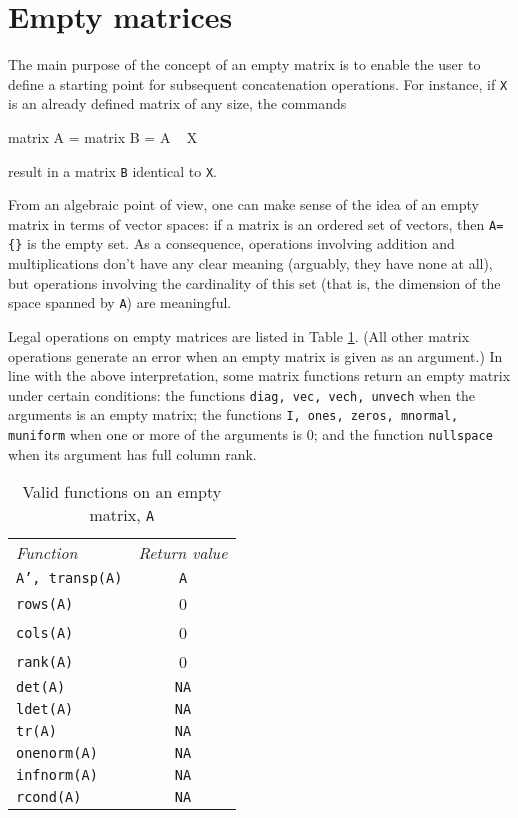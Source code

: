 
\section{Empty matrices}
\label{sec:emptymatrix}

The main purpose of the concept of an empty matrix is to enable the
user to define a starting point for subsequent concatenation
operations.  For instance, if \texttt{X} is an already defined
matrix of any size, the commands
%
\begin{code}
  matrix A = {}
  matrix B = A ~ X
\end{code}
%
result in a matrix \texttt{B} identical to \texttt{X}.

From an algebraic point of view, one can make sense of the idea of an
empty matrix in terms of vector spaces: if a matrix is an ordered set
of vectors, then \verb|A={}| is the empty set.  As a consequence,
operations involving addition and multiplications don't have any clear
meaning (arguably, they have none at all), but operations involving
the cardinality of this set (that is, the dimension of the space
spanned by \texttt{A}) are meaningful.

Legal operations on empty matrices are listed in Table
\ref{tab:empty-matrix-funcs}.  (All other matrix operations generate
an error when an empty matrix is given as an argument.)  In line with
the above interpretation, some matrix functions return an empty matrix
under certain conditions: the functions \texttt{diag, vec, vech,
  unvech} when the arguments is an empty matrix; the functions
\texttt{I, ones, zeros, mnormal, muniform} when one or more of the
arguments is 0; and the function \texttt{nullspace} when its argument
has full column rank.

\begin{table}[htbp]
\centering
\begin{tabular}{lc}
\textit{Function} & \textit{Return value} \\ [4pt]
  \texttt{A', transp(A)} & \texttt{A} \\
  \texttt{rows(A)} & 0 \\
  \texttt{cols(A)} & 0 \\
  \texttt{rank(A)} & 0 \\
  \texttt{det(A)} & \texttt{NA} \\
  \texttt{ldet(A)} & \texttt{NA} \\
  \texttt{tr(A)} & \texttt{NA} \\
  \texttt{onenorm(A)} & \texttt{NA} \\
  \texttt{infnorm(A)} & \texttt{NA} \\
  \texttt{rcond(A)} & \texttt{NA} \\
\end{tabular}
\caption{Valid functions on an empty matrix, \texttt{A}}
\label{tab:empty-matrix-funcs}
\end{table}


